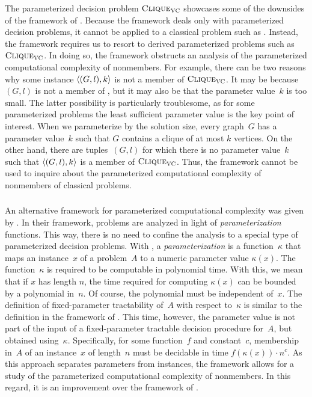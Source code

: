 The parameterized decision problem $\textnormal{\textsc{Clique}}_{\textnormal{\textsc{VC}}}$ showcases some of the downsides of the framework of \citeauthor{downey1999parameterized}.
Because the framework deals only with parameterized decision problems, it cannot be applied to a classical problem such as .
Instead, the framework requires us to resort to derived parameterized problems such as $\textnormal{\textsc{Clique}}_{\textnormal{\textsc{VC}}}$.
In doing so, the framework obstructs an analysis of the parameterized computational complexity of nonmembers.
For example, there can be two reasons why some instance ${\langle (G, l), k\rangle}$ is not a member of $\textnormal{\textsc{Clique}}_{\textnormal{\textsc{VC}}}$.
It may be because $(G, l)$ is not a member of , but it may also be that the parameter value~$k$ is too small.
The latter possibility is particularly troublesome, as for some parameterized problems the least sufficient parameter value is the key point of interest.
When we parameterize  by the solution size, every graph~$G$ has a parameter value~$k$ such that $G$ contains a clique of at most $k$ vertices.
On the other hand, there are tuples~$(G, l)$ for which there is no parameter value~$k$ such that ${\langle (G, l), k\rangle}$ is a member of $\textnormal{\textsc{Clique}}_{\textnormal{\textsc{VC}}}$.
Thus, the \citeauthor{downey1999parameterized} framework cannot be used to inquire about the parameterized computational complexity of nonmembers of classical problems.

\subsubsection{\citeauthor{flum2006parameterized}}
An alternative framework for parameterized computational complexity was given by \textcite{flum2006parameterized}.
In their framework, problems are analyzed in light of \emph{parameterization} functions.
This way, there is no need to confine the analysis to a special type of parameterized decision problems.
With \citeauthor{flum2006parameterized}, a \emph{parameterization} is a function~$\kappa$ that maps an instance~$x$ of a problem~$A$ to a numeric parameter value $\kappa(x)$.
The function~$\kappa$ is required to be computable in polynomial time.
With this, we mean that if $x$ has length $n$, the time required for computing $\kappa(x)$ can be bounded by a polynomial in~$n$.
Of course, the polynomial must be independent of~$x$.
The definition of fixed-parameter tractability of~$A$ with respect to~$\kappa$ is similar to the definition in the framework of \citeauthor{downey1999parameterized}.
This time, however, the parameter value is not part of the input of a fixed-parameter tractable decision procedure for~$A$, but obtained using~$\kappa$.
Specifically, for some function~$f$ and constant~$c$, membership in~$A$ of an instance~$x$ of length~$n$ must be decidable in time $f(\kappa(x)) \cdot n^c$.
As this approach separates parameters from instances, the framework allows for a study of the parameterized computational complexity of nonmembers.
In this regard, it is an improvement over the framework of \citeauthor{downey1999parameterized}.

